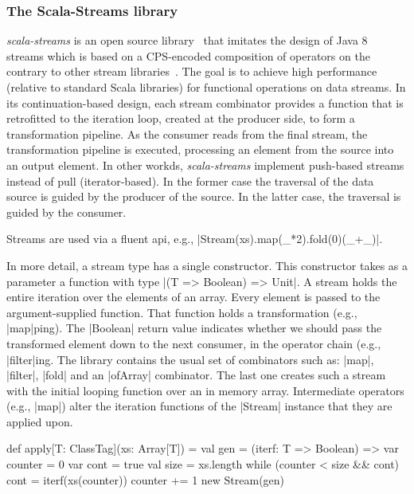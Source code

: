 \subsubsection{The Scala-Streams library} \emph{scala-streams} is an open source library~\cite{biboudis-streams} that 
imitates the design of Java 8 streams which is based on a CPS-encoded composition of operators on the contrary to other stream libraries~\cite{biboudis_clash_2014}. The goal is to achieve high performance (relative to standard Scala libraries) for functional operations on data
streams. In its continuation-based design, each stream combinator provides a function that is retrofitted to the iteration loop, created at the producer side, to form a transformation pipeline. As the consumer reads from the final stream, the transformation pipeline is executed, processing an element from the source into an output element. In other workds, \emph{scala-streams} implement push-based streams instead of pull (iterator-based). In the former case the traversal of the data source is guided by the producer of the source. In the latter case, the traversal is guided by the consumer.

Streams are used via a fluent api, e.g., |Stream(xs).map(_*2).fold(0)(_+_)|. 


In more detail, a stream type has a single constructor. This constructor takes as a parameter a function with type |(T => Boolean) => Unit|. A stream holds the entire iteration over the elements of an array. Every element is passed to the argument-supplied function. That function holds a transformation (e.g., |map|ping). The |Boolean| return value indicates whether we should pass the transformed element down to the next consumer, in the operator chain (e.g., |filter|ing. The library contains the usual set of combinators such as: |map|, |filter|, |fold| and an |ofArray| combinator. The last one creates such a stream with the initial looping function over an in memory array. Intermediate operators (e.g., |map|) alter the iteration functions of the |Stream| instance that they are applied upon. 

\begin{lstlisting-nobreak}
def apply[T: ClassTag](xs: Array[T]) = {
  val gen = (iterf: T => Boolean) => {
    var counter = 0
    var cont = true
    val size = xs.length
    while (counter < size && cont) {
      cont = iterf(xs(counter))
      counter += 1
    }
  }
  new Stream(gen)
}
\end{lstlisting-nobreak}

